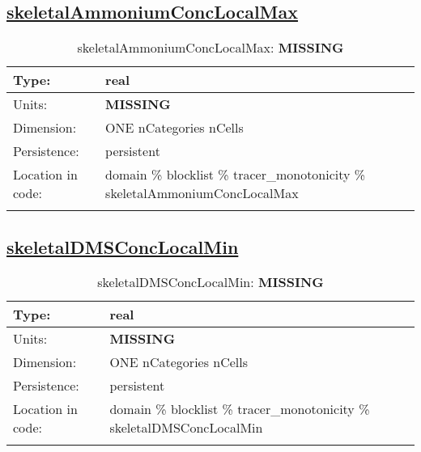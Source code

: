 \subsection[skeletalAmmoniumConcLocalMax]{\hyperref[sec:var_tab_tracer_monotonicity]{skeletalAmmoniumConcLocalMax}}
\label{subsec:var_sec_tracer_monotonicity_skeletalAmmoniumConcLocalMax}
\begin{center}
\begin{longtable}{| p{2.0in} | p{4.0in} |}
        \hline 
        Type: & real \\
        \hline 
        Units: & {\bf \color{red} MISSING} \\
        \hline 
        Dimension: & ONE nCategories nCells \\
        \hline 
        Persistence: & persistent \\
        \hline 
         Location in code: & domain \% blocklist \% tracer\_monotonicity \% skeletalAmmoniumConcLocalMax \\
         \hline 
    \caption{skeletalAmmoniumConcLocalMax: {\bf \color{red} MISSING}}
\end{longtable}
\end{center}
\subsection[skeletalDMSConcLocalMin]{\hyperref[sec:var_tab_tracer_monotonicity]{skeletalDMSConcLocalMin}}
\label{subsec:var_sec_tracer_monotonicity_skeletalDMSConcLocalMin}
\begin{center}
\begin{longtable}{| p{2.0in} | p{4.0in} |}
        \hline 
        Type: & real \\
        \hline 
        Units: & {\bf \color{red} MISSING} \\
        \hline 
        Dimension: & ONE nCategories nCells \\
        \hline 
        Persistence: & persistent \\
        \hline 
         Location in code: & domain \% blocklist \% tracer\_monotonicity \% skeletalDMSConcLocalMin \\
         \hline 
    \caption{skeletalDMSConcLocalMin: {\bf \color{red} MISSING}}
\end{longtable}
\end{center}
